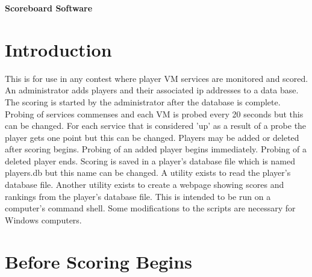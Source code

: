 \documentclass[12pt]{article}
\begin{document}
\begin{center}
{\Large\bf Scoreboard Software}
\end{center}

\section{Introduction}

This is for use in any contest where player VM services are monitored and
scored.  An administrator adds players and their associated ip addresses to a
data base. The scoring is started by the administrator after the database is
complete.  Probing of services commenses and each VM is probed every 20
seconds but this can be changed.  For each service that is considered 'up'
as a result of a probe the player gets one point but this can be changed.
Players may be added or deleted after scoring begins.  Probing of an added 
player begins immediately.  Probing of a deleted player ends.  Scoring is saved
in a player's database file which is named players.db but this name can be
changed.  A utility exists to read the player's database file.  Another utility
exists to create a webpage showing scores and rankings from the player's
database file.  This is intended to be run on a computer's command shell.  Some
modifications to the scripts are necessary for Windows computers.

\section{Before Scoring Begins}
\end{document}
